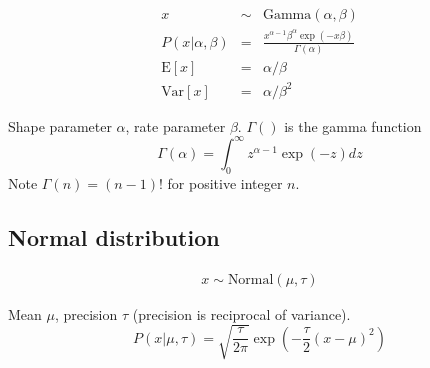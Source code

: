 \documentclass[10pt]{article}
\begin{document}
\begin{eqnarray*}
x & \sim & \mbox{Gamma}(\alpha,\beta) \\
P(x|\alpha,\beta) & = & \frac{x^{\alpha-1} \beta^\alpha \exp(-x \beta)}{\Gamma(\alpha)} \\
\mbox{E}[x] & = & \alpha/\beta \\
\mbox{Var}[x] & = & \alpha/\beta^2
\end{eqnarray*}

Shape parameter $\alpha$, rate parameter $\beta$.
$\Gamma()$ is the gamma function
\[
\Gamma(\alpha) = \int_0^{\infty} z^{\alpha-1} \exp(-z) dz
\]
Note $\Gamma(n) = (n-1)!$ for positive integer $n$.

\subsection{Normal distribution}

\begin{eqnarray*}
x \sim \mbox{Normal}(\mu,\tau)
\end{eqnarray*}


Mean $\mu$, precision $\tau$ (precision is reciprocal of variance).
\[
P(x|\mu,\tau)
 = \sqrt{\frac{\tau}{2\pi}} \exp \left( -\frac{\tau}{2}(x-\mu)^2 \right)
\]
\end{document}
